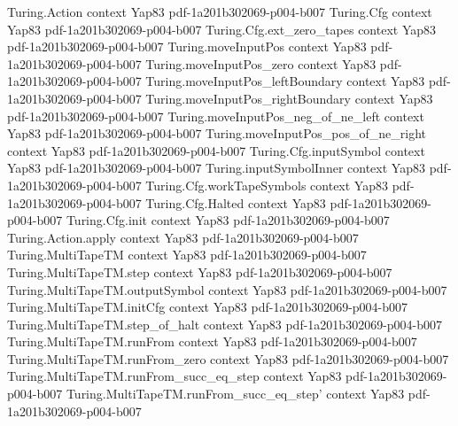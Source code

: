 \begin{theorem}
\label{Complexity.PiP_two_subset_SigmaP_two_of_NP_subset_PPoly}
\leanok
\proofstep
  {Turing.Action}
  {context}
  {Yap83}
  {pdf-1a201b302069-p004-b007}
\proofstep
  {Turing.Cfg}
  {context}
  {Yap83}
  {pdf-1a201b302069-p004-b007}
\proofstep
  {Turing.Cfg.ext_zero_tapes}
  {context}
  {Yap83}
  {pdf-1a201b302069-p004-b007}
\proofstep
  {Turing.moveInputPos}
  {context}
  {Yap83}
  {pdf-1a201b302069-p004-b007}
\proofstep
  {Turing.moveInputPos_zero}
  {context}
  {Yap83}
  {pdf-1a201b302069-p004-b007}
\proofstep
  {Turing.moveInputPos_leftBoundary}
  {context}
  {Yap83}
  {pdf-1a201b302069-p004-b007}
\proofstep
  {Turing.moveInputPos_rightBoundary}
  {context}
  {Yap83}
  {pdf-1a201b302069-p004-b007}
\proofstep
  {Turing.moveInputPos_neg_of_ne_left}
  {context}
  {Yap83}
  {pdf-1a201b302069-p004-b007}
\proofstep
  {Turing.moveInputPos_pos_of_ne_right}
  {context}
  {Yap83}
  {pdf-1a201b302069-p004-b007}
\proofstep
  {Turing.Cfg.inputSymbol}
  {context}
  {Yap83}
  {pdf-1a201b302069-p004-b007}
\proofstep
  {Turing.inputSymbolInner}
  {context}
  {Yap83}
  {pdf-1a201b302069-p004-b007}
\proofstep
  {Turing.Cfg.workTapeSymbols}
  {context}
  {Yap83}
  {pdf-1a201b302069-p004-b007}
\proofstep
  {Turing.Cfg.Halted}
  {context}
  {Yap83}
  {pdf-1a201b302069-p004-b007}
\proofstep
  {Turing.Cfg.init}
  {context}
  {Yap83}
  {pdf-1a201b302069-p004-b007}
\proofstep
  {Turing.Action.apply}
  {context}
  {Yap83}
  {pdf-1a201b302069-p004-b007}
\proofstep
  {Turing.MultiTapeTM}
  {context}
  {Yap83}
  {pdf-1a201b302069-p004-b007}
\proofstep
  {Turing.MultiTapeTM.step}
  {context}
  {Yap83}
  {pdf-1a201b302069-p004-b007}
\proofstep
  {Turing.MultiTapeTM.outputSymbol}
  {context}
  {Yap83}
  {pdf-1a201b302069-p004-b007}
\proofstep
  {Turing.MultiTapeTM.initCfg}
  {context}
  {Yap83}
  {pdf-1a201b302069-p004-b007}
\proofstep
  {Turing.MultiTapeTM.step_of_halt}
  {context}
  {Yap83}
  {pdf-1a201b302069-p004-b007}
\proofstep
  {Turing.MultiTapeTM.runFrom}
  {context}
  {Yap83}
  {pdf-1a201b302069-p004-b007}
\proofstep
  {Turing.MultiTapeTM.runFrom_zero}
  {context}
  {Yap83}
  {pdf-1a201b302069-p004-b007}
\proofstep
  {Turing.MultiTapeTM.runFrom_succ_eq_step}
  {context}
  {Yap83}
  {pdf-1a201b302069-p004-b007}
\proofstep
  {Turing.MultiTapeTM.runFrom_succ_eq_step'}
  {context}
  {Yap83}
  {pdf-1a201b302069-p004-b007}

\end{theorem}
